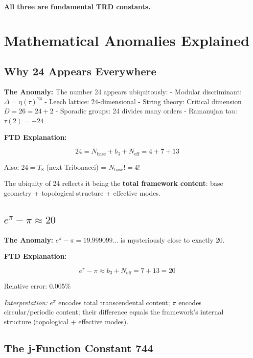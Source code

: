 \documentclass[
  11pt,
  letterpaper,
  twoside,
  openany]{book}
\makeatletter
\let\orig@section\section
\renewcommand{\section}{\needspace{8\baselineskip}\orig@section}
\let\orig@subsection\subsection
\renewcommand{\subsection}{\needspace{6\baselineskip}\orig@subsection}
\makeatother
\begin{document}
\textbf{All three are fundamental TRD constants.}

\section{Mathematical Anomalies
Explained}\label{mathematical-anomalies-explained}

\subsection{Why 24 Appears Everywhere}\label{why-24-appears-everywhere}

\textbf{The Anomaly:} The number 24 appears ubiquitously: - Modular
discriminant: \(\Delta = \eta(\tau)^{24}\) - Leech lattice:
24-dimensional - String theory: Critical dimension \(D = 26 = 24 + 2\) -
Sporadic groups: 24 divides many orders - Ramanujan tau:
\(\tau(2) = -24\)

\textbf{FTD Explanation:}

\[24 = N_{\text{base}} + b_3 + N_{\text{eff}} = 4 + 7 + 13\]

Also: \(24 = T_8\) (next Tribonacci) = \(N_{\text{base}}! = 4!\)

The ubiquity of 24 reflects it being the \textbf{total framework
content}: base geometry + topological structure + effective modes.

\subsection{\texorpdfstring{\(e^\pi - \pi \approx 20\)}{e\^{}\textbackslash pi - \textbackslash pi \textbackslash approx 20}}\label{epi---pi-approx-20}

\textbf{The Anomaly:} \(e^\pi - \pi = 19.999099...\) is mysteriously
close to exactly 20.

\textbf{FTD Explanation:}

\[e^\pi - \pi \approx b_3 + N_{\text{eff}} = 7 + 13 = 20\]

Relative error: 0.005\%

\emph{Interpretation:} \(e^\pi\) encodes total transcendental content;
\(\pi\) encodes circular/periodic content; their difference equals the
framework's internal structure (topological + effective modes).

\subsection{The j-Function Constant
744}\label{the-j-function-constant-744}
\end{document}
